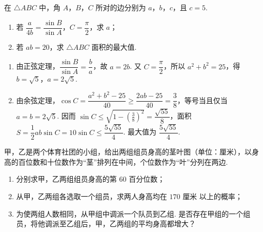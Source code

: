 \begin{problem}
在 \(\triangle ABC\) 中，角 \(A\)，\(B\)，\(C\) 所对的边分别为 \(a\)，\(b\)，\(c\)，且 \(c=5\).
\begin{enumerate}
\item 若 \(\dfrac{a}{4b}=\dfrac{\sin B}{\sin A}\)，\(C=\dfrac\pi2\)，求 \(a\)；
\item 若 \(ab=20\)，求 \(\triangle ABC\) 面积的最大值.
\end{enumerate}
\end{problem}

\begin{solution}
\begin{enumerate}
\item 由正弦定理，\(\dfrac{\sin B}{\sin A}=\dfrac ba\)，故 \(a=2b\). 又 \(C=\dfrac\pi2\)，所以 \(a^2+b^2=25\)，得 \(b=\sqrt5\)，\(a=2\sqrt5\).
\item 由余弦定理，\(\cos C=\dfrac{a^2+b^2-25}{40}\ge\dfrac{2ab-25}{40}=\dfrac38\)，等号当且仅当 \(a=b=2\sqrt5\). 因而 \(\sin C\le\sqrt{1-(\frac{3}{8})^2}=\dfrac{\sqrt{55}}8\)，面积 \(S=\dfrac12ab\sin C=10\sin C\le\dfrac{5\sqrt{55}}4\). 最大值为 \(\dfrac{5\sqrt{55}}4\).
\end{enumerate}
\end{solution}

\begin{problem}
甲，乙是两个体育社团的小组，给出两组组员身高的茎叶图（单位：厘米），以身高的百位数和十位数作为“茎”排列在中间，个位数作为“叶”分列在两边.



\begin{enumerate}
\item 分别求甲，乙两组组员身高的第 \(60\) 百分位数；
\item 从甲，乙两组各选取一个组员，求两人身高均在 \(170\text{ 厘米}\) 以上的概率；
\item 为使两组人数相同，从甲组中调派一个队员到乙组. 是否存在甲组的一个组员，将他调派至乙组后，甲，乙两组的平均身高都增大？
\end{enumerate}
\end{problem}

